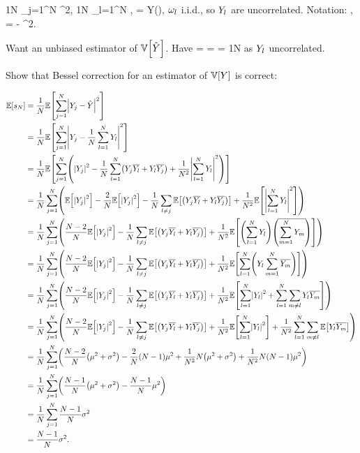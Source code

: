 \beqs
\sN \de \frac1N \sum_{j=1}^N \abs{\yj-\Yhat}^2,
\eeqs
\beqs
\Yhat \de \frac1N \sum_{l=1}^N \Yl,
\eeqs
\beqs
\Yl = Y(\omegal),
\eeqs
$\omega_{l}$ i.i.d., so $Y_{l}$ are uncorrelated.
Notation:
\beqs
\mu \de {},
\eeqs
\beqs
\sigma \de {} =  - ^2.
\eeqs

Want an unbiased estimator of $\VAR{\Yhat}$. Have
\beqs
\VAR{\Yhat} =  =   = \frac1N 
\eeqs
as $Y_{l}$ uncorrelated.

Show that Bessel correction for an estimator of $\VAR{Y}$ is correct:

\begin{align*}
  \EXP{\sN} &= \frac1N \EXP{\sum_{j=1}^N \abs{\Yj - \Yhat}^2}\\
  &= \frac1N\EXP{\sum_{j=1}^N \abs{\Yj  - \frac1N \sum_{l=1}^N \Yl}^2}\\
  & = \frac1N \EXP{\sum_{j=1}^N\mleft(\abs{\Yj}^2 - \frac1N \sum_{l=1}^N \mleft(\Yj \Ylbar + \Yl\Yjbar\mright) + \frac1{N^2} \abs{\sum_{l=1}^N  \Yl}^2\mright)}\\
  & = \frac1N \sum_{j=1}^N\mleft(\EXP{\abs{\Yj}^2} -\frac2N \EXP{\abs{\Yj}^2} -\frac1N \sum_{l\neq j} \EXP{\mleft(\Yj \Ylbar + \Yl\Yjbar\mright)} + \frac1{N^2}\EXP{ \abs{\sum_{l=1}^N  \Yl}^2}\mright)\\
  & = \frac1N \sum_{j=1}^N\mleft(\frac{N-2}N\EXP{\abs{\Yj}^2}-\frac1N \sum_{l\neq j} \EXP{\mleft(\Yj \Ylbar + \Yl\Yjbar\mright)} + \frac1{N^2}\EXP{ \mleft(\sum_{l=1}^N\Yl\mright)\mleft(\overline{\sum_{m=1}^N  \Ym}\mright)}\mright)\\
  & = \frac1N \sum_{j=1}^N\mleft(\frac{N-2}N\EXP{\abs{\Yj}^2}-\frac1N \sum_{l\neq j} \EXP{\mleft(\Yj \Ylbar + \Yl\Yjbar\mright)} + \frac1{N^2}\EXP{ \sum_{l=1}^N\mleft(\Yl\sum_{m=1}^N  \Ymbar\mright)}\mright)\\
  & = \frac1N \sum_{j=1}^N\mleft(\frac{N-2}N\EXP{\abs{\Yj}^2}-\frac1N \sum_{l\neq j} \EXP{\mleft(\Yj \Ylbar + \Yl\Yjbar\mright)} + \frac1{N^2}\EXP{ \sum_{l=1}^N\abs{\Yl}^2 + \sum_{l=1}^N \sum_{m\neq l} \Yl \Ymbar}\mright)\\
  & = \frac1N \sum_{j=1}^N\mleft(\frac{N-2}N\EXP{\abs{\Yj}^2}-\frac1N \sum_{l\neq j} \EXP{\mleft(\Yj \Ylbar + \Yl\Yjbar\mright)} + \frac1{N^2}\EXP{ \sum_{l=1}^N\abs{\Yl}^2} +\frac1{N^2} \sum_{l=1}^N \sum_{m\neq l} \EXP{\Yl \Ymbar}\mright)\\
  &= \frac1N \sum_{j=1}^N \mleft(\frac{N-2}N \mleft(\mu^2 + \sigma^2\mright) - \frac2N \mleft(N-1\mright) \mu^2 + \frac1{N^2} N \mleft(\mu^2 + \sigma^2\mright) + \frac1{N^2} N \mleft(N-1\mright) \mu^2\mright)\\
  &= \frac1N \sum_{j=1}^N \mleft( \frac{N-1}N \mleft(\mu^2 + \sigma^2\mright) - \frac{N-1}{N} \mu^2\mright)\\
  &= \frac1N \sum_{j=1}^N \frac{N-1}N \sigma^2\\
  &= \frac{N-1}{N} \sigma^2.
  \end{align*}

